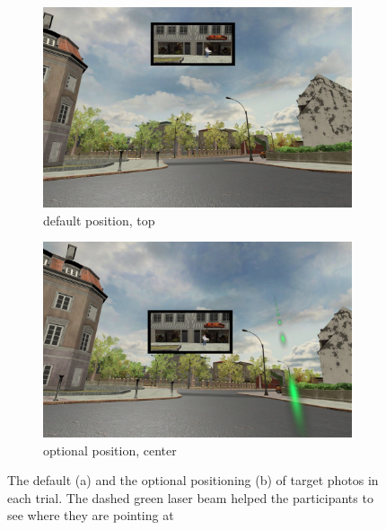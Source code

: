 \begin{figure}[h!]
	\centering
	\begin{subfigure}[b]{0.48\linewidth}
		\includegraphics[width=\linewidth]{figures/photo_position_top.jpg}
		\caption{default position, top}
		\label{fig:photo_position_top}
	\end{subfigure}
	\begin{subfigure}[b]{0.48\linewidth}
		\includegraphics[width=\linewidth]{figures/photo_position_center.jpg}
		\caption{optional position, center}
		\label{fig:photo_position_center}
	\end{subfigure}
	
	\caption[Trial's target photo positions]{The default (a) and the optional positioning (b) of target photos in each trial. The dashed green laser beam helped the participants to see where they are pointing at
	}
	\label{fig:photo_positions}
\end{figure}

